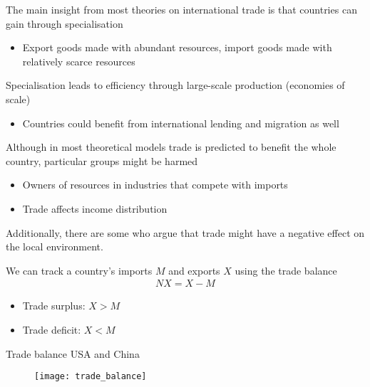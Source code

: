 \documentclass{beamer}
\begin{document}
\begin{frame}
  The main insight from most theories on international trade is that countries can gain through specialisation
  \begin{itemize}
    \item Export goods made with abundant resources, import goods made with relatively scarce resources
  \end{itemize}
  \medskip
  Specialisation leads to efficiency through large-scale production (economies of scale)
  \begin{itemize}
    \item Countries could benefit from international lending and migration as well
  \end{itemize}
\end{frame}

\begin{frame}
  Although in most theoretical models trade is predicted to benefit the whole country, particular groups might be harmed
  \begin{itemize}
    \item Owners of resources in industries that compete with imports
    \item Trade affects income distribution
  \end{itemize}
  \medskip
  Additionally, there are some who argue that trade might have a negative effect on the local environment.
\end{frame}

\begin{frame}{}
  We can track a country's imports $M$ and exports $X$ using the trade balance  
  \begin{align*}
    NX = X - M
  \end{align*}
  \begin{itemize}
    \item Trade surplus: $X>M$
    \item Trade deficit: $X<M$
  \end{itemize}
\end{frame}

\begin{frame}{Trade balance USA and China}
  \begin{figure}
    \texttt{[image: trade\_balance]}
  \end{figure}
  
\end{frame}
\end{document}
